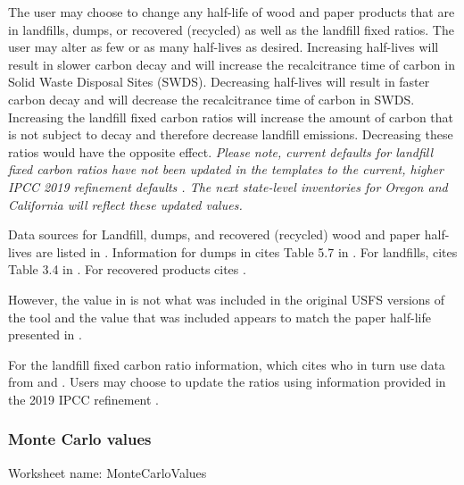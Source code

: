 \documentclass[
  openany]{book}
\begin{document}
The user may choose to change any half-life of wood and paper products that are in landfills, dumps, or recovered (recycled) as well as the landfill fixed ratios. The user may alter as few or as many half-lives as desired. Increasing half-lives will result in slower carbon decay and will increase the recalcitrance time of carbon in Solid Waste Disposal Sites (SWDS). Decreasing half-lives will result in faster carbon decay and will decrease the recalcitrance time of carbon in SWDS. Increasing the landfill fixed carbon ratios will increase the amount of carbon that is not subject to decay and therefore decrease landfill emissions. Decreasing these ratios would have the opposite effect. \emph{Please note, current defaults for landfill fixed carbon ratios have not been updated in the templates to the current, higher IPCC 2019 refinement defaults \autocite{buendia2019}. The next state-level inventories for Oregon and California will reflect these updated values.}

Data sources for Landfill, dumps, and recovered (recycled) wood and paper half-lives are listed in \textcite{skog2008}. Information for dumps in \textcite{skog2008} cites Table 5.7 in \textcite{penman2000}. For landfills, \textcite{skog2008} cites Table 3.4 in \textcite{buendia2019}. For recovered products \textcite{skog2008} cites \textcite{pingoud2006}.

However, the value in \textcite{pingoud2006} is not what was included in the original USFS versions of the tool and the value that was included appears to match the paper half-life presented in \textcite{smith2006}.

For the landfill fixed carbon ratio information, \textcite{skog2008} which cites \textcite{freed2003} who in turn use data from \textcite{barlaz1998} and \textcite{eleazer1997}. Users may choose to update the ratios using information provided in the 2019 IPCC refinement \autocite{ruter2019}.

\hypertarget{own-prov-input-mc}{%
\subsubsection{Monte Carlo values}\label{own-prov-input-mc}}

Worksheet name: MonteCarloValues
\end{document}
